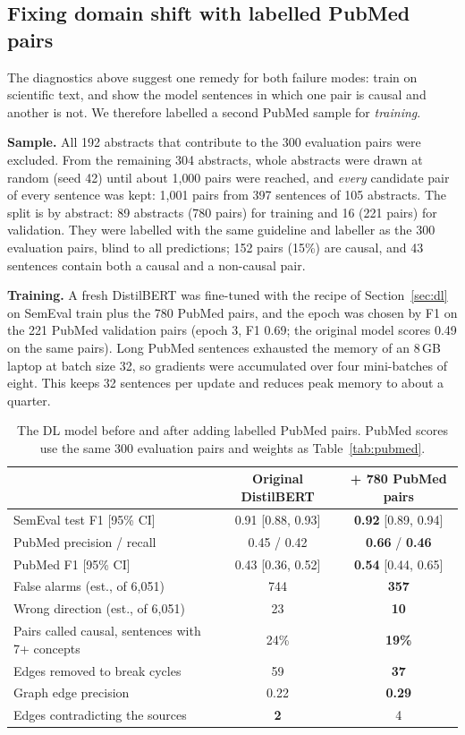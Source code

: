 \documentclass[11pt,a4paper]{article}
\begin{document}
\subsection{Fixing domain shift with labelled PubMed pairs}

The diagnostics above suggest one remedy for both failure modes: train on scientific text, and show the model sentences in which one
pair is causal and another is not. We therefore labelled a second PubMed sample for \emph{training}.

\textbf{Sample.} All 192 abstracts that contribute to the 300 evaluation pairs were excluded. From the remaining 304 abstracts, whole
abstracts were drawn at random (seed 42) until about 1{,}000 pairs were reached, and \emph{every} candidate pair of every sentence was
kept: 1{,}001 pairs from 397 sentences of 105 abstracts. The split is by abstract: 89 abstracts (780 pairs) for training and 16
(221 pairs) for validation. They were labelled with the same guideline and labeller as the 300 evaluation pairs, blind to all predictions;
152 pairs (15\%) are causal, and 43 sentences contain both a causal and a non-causal pair.

\textbf{Training.} A fresh DistilBERT was fine-tuned with the recipe of Section~\ref{sec:dl} on SemEval train plus the 780 PubMed pairs, and the
epoch was chosen by F1 on the 221 PubMed validation pairs (epoch 3, F1 0.69; the original model scores 0.49 on the same pairs). Long
PubMed sentences exhausted the memory of an 8\,GB laptop at batch size 32, so gradients were accumulated over four mini-batches of
eight. This keeps 32 sentences per update and reduces peak memory to about a quarter.

\begin{table}[H]
\centering\small
\begin{tabular}{@{}lcc@{}}
\toprule
 & Original DistilBERT & + 780 PubMed pairs \\
\midrule
SemEval test F1 [95\% CI] & 0.91 [0.88, 0.93] & \textbf{0.92} [0.89, 0.94] \\
PubMed precision / recall & 0.45 / 0.42 & \textbf{0.66} / \textbf{0.46} \\
PubMed F1 [95\% CI] & 0.43 [0.36, 0.52] & \textbf{0.54} [0.44, 0.65] \\
False alarms (est., of 6{,}051) & 744 & \textbf{357} \\
Wrong direction (est., of 6{,}051) & 23 & \textbf{10} \\
Pairs called causal, sentences with 7+ concepts & 24\% & \textbf{19\%} \\
Edges removed to break cycles & 59 & \textbf{37} \\
Graph edge precision & 0.22 & \textbf{0.29} \\
Edges contradicting the sources & \textbf{2} & 4 \\
\bottomrule
\end{tabular}
\caption{The DL model before and after adding labelled PubMed pairs. PubMed scores use the same 300 evaluation pairs and weights as
Table~\ref{tab:pubmed}.}
\label{tab:fix}
\end{table}
\end{document}
